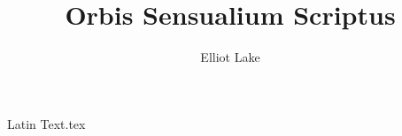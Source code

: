 \documentclass[11pt]{book}
\author{Elliot Lake}
\title{Orbis Sensualium Scriptus}
\begin{document}
\maketitle 
\tableofcontents

{Latin Text.tex}
\end{document}
